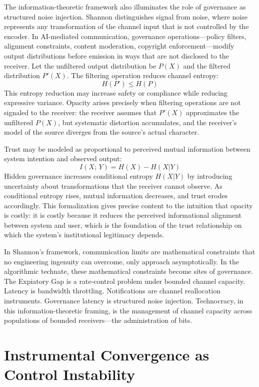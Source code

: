 \documentclass[12pt]{article}
\begin{document}
The information-theoretic framework also illuminates the role of governance as structured noise injection. Shannon distinguishes signal from noise, where noise represents any transformation of the channel input that is not controlled by the encoder. In AI-mediated communication, governance operations---policy filters, alignment constraints, content moderation, copyright enforcement---modify output distributions before emission in ways that are not disclosed to the receiver. Let the unfiltered output distribution be $P(X)$ and the filtered distribution $P'(X)$. The filtering operation reduces channel entropy:
\[
H(P') \le H(P)
\]
This entropy reduction may increase safety or compliance while reducing expressive variance. Opacity arises precisely when filtering operations are not signaled to the receiver: the receiver assumes that $P'(X)$ approximates the unfiltered $P(X)$, but systematic distortion accumulates, and the receiver's model of the source diverges from the source's actual character.

Trust may be modeled as proportional to perceived mutual information between system intention and observed output:
\[
I(X;\,Y) = H(X) - H(X|Y)
\]
Hidden governance increases conditional entropy $H(X|Y)$ by introducing uncertainty about transformations that the receiver cannot observe. As conditional entropy rises, mutual information decreases, and trust erodes accordingly. This formalization gives precise content to the intuition that opacity is costly: it is costly because it reduces the perceived informational alignment between system and user, which is the foundation of the trust relationship on which the system's institutional legitimacy depends.

In Shannon's framework, communication limits are mathematical constraints that no engineering ingenuity can overcome, only approach asymptotically. In the algorithmic technate, these mathematical constraints become sites of governance. The Expiatory Gap is a rate-control problem under bounded channel capacity. Latency is bandwidth throttling. Notifications are channel reallocation instruments. Governance latency is structured noise injection. Technocracy, in this information-theoretic framing, is the management of channel capacity across populations of bounded receivers---the administration of bits.

\section{Instrumental Convergence as Control Instability}
\end{document}
